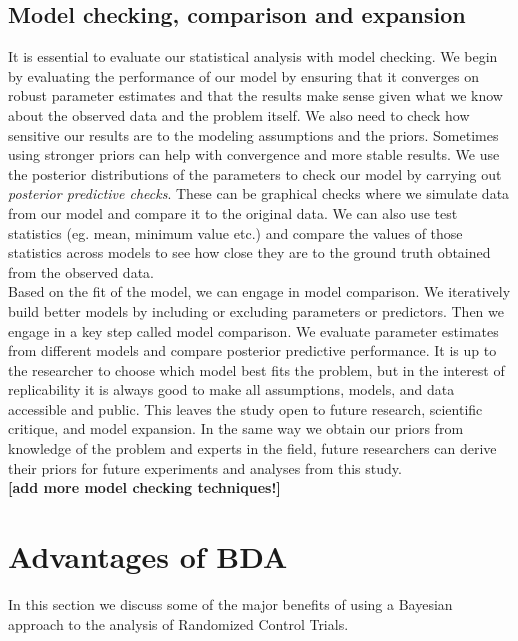 \documentclass{article}
\begin{document}
\subsection{Model checking, comparison and expansion}
It is essential to evaluate our statistical analysis with model checking. We begin by evaluating the performance of our model by ensuring that it converges on robust parameter estimates and that the results make sense given what we know about the observed data and the problem itself. We also need to check how sensitive our results are to the modeling assumptions and the priors. Sometimes using stronger priors can help with convergence and more stable results. We use the posterior distributions of the parameters to check our model by carrying out \textit{posterior predictive checks}. These can be graphical checks where we simulate data from our model and compare it to the original data. We can also use test statistics (eg. mean, minimum value etc.) and compare the values of those statistics across models to see how close they are to the ground truth obtained from the observed data.\\
Based on the fit of the model, we can engage in model comparison. We iteratively build better models by including or excluding parameters or predictors. Then we engage in a key step called model comparison. We evaluate parameter estimates from different models and compare posterior predictive performance. It is up to the researcher to choose which model best fits the problem, but in the interest of replicability it is always good to make all assumptions, models, and data accessible and public. This leaves the study open to future research, scientific critique, and model expansion. In the same way we obtain our priors from knowledge of the problem and experts in the field, future researchers can derive their priors for future experiments and analyses from this study.\\
\textbf{[add more model checking techniques!]}

\section{Advantages of BDA}
In this section we discuss some of the major benefits of using a Bayesian approach to the analysis of Randomized Control Trials.
\end{document}
